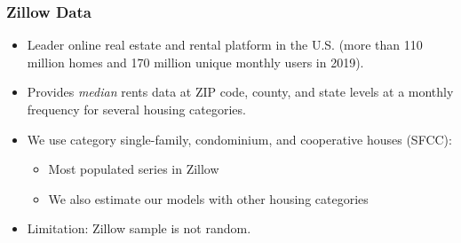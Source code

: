 \documentclass[aspectratio=169, t]{beamer}
\begin{document}
\begin{frame}[label = zillow_data]
    \frametitle{Zillow Data}
    
    \begin{itemize}
        \item Leader online real estate and rental platform in the U.S. {\small (more 
        than 110 million homes and 170 million unique monthly users in 2019).}
        
        \vspace{2mm} \item
        Provides \textit{median} rents data at ZIP code, county, and state levels 
        at a monthly frequency for several housing categories.
        
        \pause
        \vspace{2mm} \item
        We use category single-family, condominium, and cooperative houses (SFCC):
        \begin{itemize}
            \item Most populated series in Zillow
            \item We also estimate our models with other housing categories
        \end{itemize}
        
        \vspace{2mm} \item
        Limitation: Zillow sample is not random.        
        \hyperlink{zillow_pop_density}{}

    \end{itemize}
\end{frame}
\end{document}
